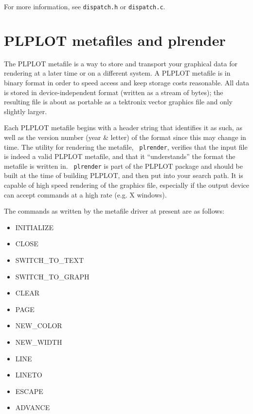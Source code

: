 For more information, see {\tt dispatch.h} or {\tt dispatch.c}.

\section{PLPLOT metafiles and plrender}

The PLPLOT metafile is a way to store and transport your graphical data for
rendering at a later time or on a different system.  A PLPLOT metafile is
in binary format in order to speed access and keep storage costs
reasonable.  All data is stored in device-independent format (written as a
stream of bytes); the resulting file is about as portable as a tektronix
vector graphics file and only slightly larger. 

Each PLPLOT metafile begins with a header string that identifies it as
such, as well as the version number (year \& letter) of the format since
this may change in time.  The utility for rendering the metafile, {\tt
plrender}, verifies that the input file is indeed a valid PLPLOT metafile,
and that it ``understands'' the format the metafile is written in.  {\tt
plrender} is part of the PLPLOT package and should be built at the time of
building PLPLOT, and then put into your search path.  It is capable of 
high speed rendering of the graphics file, especially if the output device
can accept commands at a high rate (e.g. X windows). 

The commands as written by the metafile driver at present are as follows:
\begin{itemize}
\item INITIALIZE 
\item CLOSE 
\item SWITCH\_TO\_TEXT 
\item SWITCH\_TO\_GRAPH 
\item CLEAR 
\item PAGE 
\item NEW\_COLOR 
\item NEW\_WIDTH 
\item LINE 
\item LINETO 
\item ESCAPE 
\item ADVANCE
\end{itemize}

